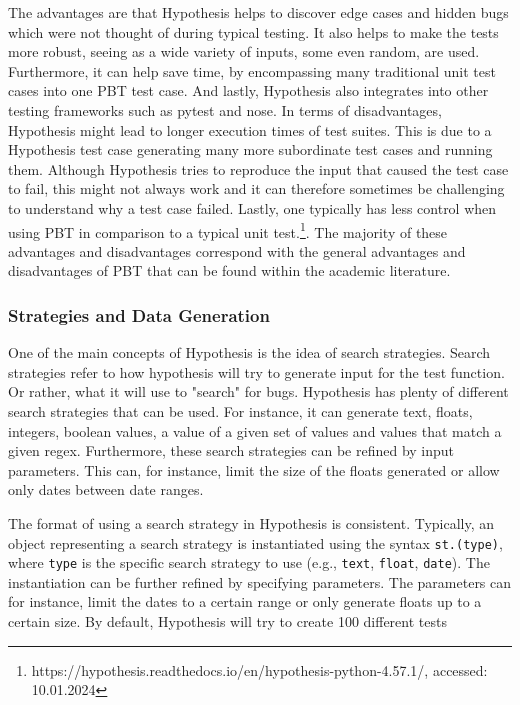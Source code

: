 \documentclass[runningheads]{llncs}
\begin{document}
The advantages are that Hypothesis helps to discover edge cases and hidden bugs which were not thought of during typical testing. It also helps to make the tests more robust, seeing as a wide variety of inputs, some even random, are used.
Furthermore, it can help save time, by encompassing many traditional unit test cases into one PBT test case. And lastly, Hypothesis also integrates into other testing frameworks such as pytest and nose. In terms of disadvantages, Hypothesis might lead to longer execution times of test suites. This is due to a Hypothesis test case generating many more subordinate test cases and running them. Although Hypothesis tries to reproduce the input that caused the test case to fail, this might not always work and it can therefore sometimes be challenging to understand why a test case failed.
Lastly, one typically has less control when using PBT in comparison to a typical unit test.\footnote{https://hypothesis.readthedocs.io/en/hypothesis-python-4.57.1/, accessed: 10.01.2024}. The majority of these advantages and disadvantages correspond with the general advantages and disadvantages of PBT that can be found within the academic literature.

\subsubsection{Strategies and Data Generation}
One of the main concepts of Hypothesis is the idea of search strategies. Search strategies refer to how hypothesis will try to generate input for the test function. Or rather, what it will use to "search" for bugs. Hypothesis has plenty of different search strategies that can be used. For instance, it can generate text, floats, integers, boolean values, a value of a given set of values and values that match a given regex. Furthermore, these search strategies can be refined by input parameters. This can, for instance, limit the size of the floats generated or allow only dates between date ranges.

The format of using a search strategy in Hypothesis is consistent. Typically, an object representing a search strategy is instantiated using the syntax \texttt{st.(type)}, where \texttt{type} is the specific search strategy to use (e.g., \texttt{text}, \texttt{float}, \texttt{date}). The instantiation can be further refined by specifying parameters. The parameters can for instance, limit the dates to a certain range or only generate floats up to a certain size. By default, Hypothesis will try to create 100 different tests
\end{document}
